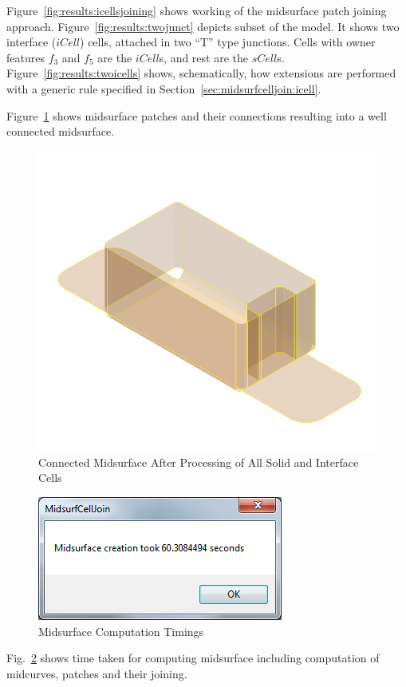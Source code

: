 Figure~\ref{fig:results:icellsjoining} shows working of the midsurface patch joining approach. Figure~\ref{fig:results:twojunct} depicts subset of the model. It shows two interface ($iCell$) cells, attached in two ``T'' type junctions. Cells with owner features $f_3$ and $f_5$ are the $iCell$s, and rest are the $sCell$s. Figure~\ref{fig:results:twoicells} shows, schematically, how extensions are performed with a generic rule specified in Section~\ref{sec:midsurfcelljoin:icell}.


Figure~\ref{fig:results:midsurfcells} shows midsurface patches and their connections resulting into a well connected midsurface. 



\begin{figure}[!h]
\centering     %
\includegraphics[width=0.62\linewidth,valign=t]{images/SheetMetal_Medium_Enclosure_midsurf_part}
\caption{Connected Midsurface After Processing of All Solid and Interface Cells}
\label{fig:results:midsurfcells}
\end{figure}




\begin{figure}[!h]
\centering     %
\includegraphics[width=0.6\linewidth,valign=t]{images/MidsurfaceEnclosureTimings}
\caption{Midsurface Computation Timings}
\label{fig:results:midsurftimings}
\end{figure}
Fig.~\ref{fig:results:midsurftimings} shows time taken for computing midsurface including computation of midcurves, patches and their joining.

